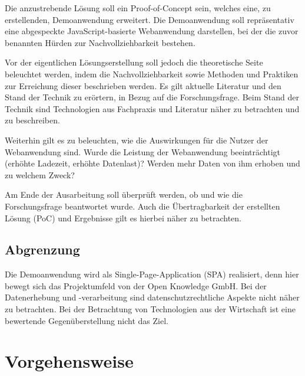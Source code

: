 Die anzustrebende Lösung soll ein Proof-of-Concept sein, welches eine, zu erstellenden, Demoanwendung erweitert. Die Demoanwendung soll repräsentativ eine abgespeckte JavaScript-basierte Webanwendung darstellen, bei der die zuvor benannten Hürden zur Nachvollziehbarkeit bestehen.

Vor der eigentlichen Lösungserstellung soll jedoch die theoretische Seite beleuchtet werden, indem die Nachvollziehbarkeit sowie Methoden und Praktiken zur Erreichung dieser beschrieben werden. Es gilt aktuelle Literatur und den Stand der Technik zu erörtern, in Bezug auf die Forschungsfrage. Beim Stand der Technik sind Technologien aus Fachpraxis und Literatur näher zu betrachten und zu beschreiben.

Weiterhin gilt es zu beleuchten, wie die Auswirkungen für die Nutzer der Webanwendung sind. Wurde die Leistung der Webanwendung beeinträchtigt (erhöhte Ladezeit, erhöhte Datenlast)? Werden mehr Daten von ihm erhoben und zu welchem Zweck?

Am Ende der Ausarbeitung soll überprüft werden, ob und wie die Forschungsfrage beantwortet wurde. Auch die Übertragbarkeit der erstellten Lösung (PoC) und Ergebnisse gilt es hierbei näher zu betrachten.

\subsection{Abgrenzung}


Die Demoanwendung wird als Single-Page-Application (SPA) realisiert, denn hier bewegt sich das Projektumfeld von der Open Knowledge GmbH. Bei der Datenerhebung und -verarbeitung sind datenschutzrechtliche Aspekte nicht näher zu betrachten. Bei der Betrachtung von Technologien aus der Wirtschaft ist eine bewertende Gegenüberstellung nicht das Ziel.

\pagebreak

\section{Vorgehensweise}

